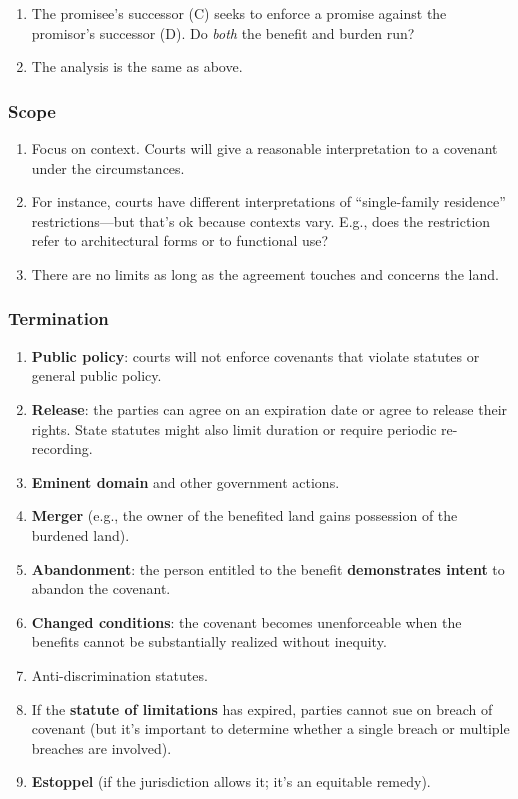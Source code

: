 \begin{enumerate}
    \item The promisee's successor (C) seeks to enforce a promise against the 
    promisor's successor (D). Do \emph{both} the benefit and burden run?
    \item The analysis is the same as above.
\end{enumerate}

\subsubsection{Scope}

\begin{enumerate}
    \item Focus on context. Courts will give a reasonable interpretation to a 
    covenant under the circumstances.
    \item For instance, courts have different interpretations of 
    ``single-family residence'' restrictions---but that's ok because contexts 
    vary. E.g., does the restriction refer to architectural forms or to 
    functional use?
    \item There are no limits as long as the agreement touches and concerns 
    the land.
\end{enumerate}

\subsubsection{Termination}

\begin{enumerate}
    \item \textbf{Public policy}: courts will not enforce covenants that 
    violate statutes or general public policy.
    \item \textbf{Release}: the parties can agree on an expiration date or 
    agree to release their rights. State statutes might also limit duration or 
    require periodic re-recording.
    \item \textbf{Eminent domain} and other government actions.
    \item \textbf{Merger} (e.g., the owner of the benefited land gains 
    possession of the burdened land).
    \item \textbf{Abandonment}: the person entitled to the benefit 
    \textbf{demonstrates intent} to abandon the covenant.
    \item \textbf{Changed conditions}: the covenant becomes unenforceable when 
    the benefits cannot be substantially realized without inequity.
    \item Anti-discrimination statutes.
    \item If the \textbf{statute of limitations} has expired, parties cannot 
    sue on breach of covenant (but it's important to determine whether a 
    single breach or multiple breaches are involved).
    \item \textbf{Estoppel} (if the jurisdiction allows it; it's an equitable 
    remedy).
\end{enumerate}

